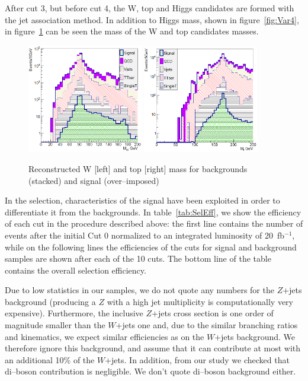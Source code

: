 After cut 3, but before cut 4, the W, top and Higgs candidates are formed with the jet association method. In addition to Higgs mass, shown in figure~\ref{fig:Var4}, in figure~\ref{fig:MWMTop} can be seen the mass of the W and top candidates masses.

\begin{figure}[!Hhtbp]
  \begin{center}
    \includegraphics[width=0.45\textwidth]{figs/Pheno/MW.png}
    \includegraphics[width=0.45\textwidth]{figs/Pheno/Mtop.png}
    \caption{Reconstructed W [left] and top [right] mass for backgrounds (stacked) and signal (over--imposed)}
    \label{fig:MWMTop}
  \end{center}
\end{figure}

In the selection, characteristics of the signal have been exploited in order to differentiate it from the backgrounds. In table~\ref{tab:SelEff}, we show the efficiency of each cut in the procedure described above: the first line contains the number of events after the initial Cut 0 normalized to an integrated luminosity of 20~fb$^{-1}$, while on the following lines the efficiencies of the cuts for signal and background samples are shown after each of the 10 cuts. The bottom line of the table contains the overall selection efficiency. 

Due to low statistics in our samples, we do not quote any numbers for the $Z$+jets background (producing a $Z$ with a high jet multiplicity is computationally very expensive). Furthermore, the inclusive $Z$+jets cross section is one order of magnitude smaller than the $W$+jets one and, due to the similar branching ratios and kinematics, we expect similar efficiencies as on the $W$+jets background. We therefore ignore this background, and assume that it can contribute at most with an additional 10\% of the $W$+jets. In addition, from our study we checked that di--boson contribution is negligible. We don't quote di--boson background either.

